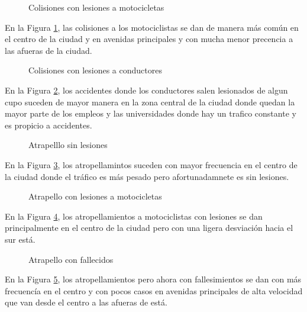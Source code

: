 \documentclass[a4paper]{article}
\begin{document}
\begin{figure}[H]
    \centering

    \caption{Colisiones con lesiones a motocicletas\\\autocite{DatosInegi}}
    \label{fig:Mapa2}
\end{figure}
En la Figura \ref{fig:Mapa2}, las colisiones  a los motociclistas se dan de manera más común en el centro de la ciudad y en avenidas principales y con mucha menor precencia a las afueras de la ciudad.


\begin{figure}[H]
    \centering

    \caption{Colisiones con lesiones a conductores\\\autocite{DatosInegi}}
    \label{fig:Mapa3}
\end{figure}
En la Figura \ref{fig:Mapa3}, los accidentes donde los conductores salen lesionados de algun cupo suceden de mayor manera en la zona central de la ciudad donde quedan la mayor parte de los empleos y las universidades donde hay un trafico constante y es propicio a accidentes.

\begin{figure}[H]
    \centering

    \caption{Atrapelllo sin lesiones\\\autocite{DatosInegi}}
    \label{fig:Mapa4}
\end{figure}
En la Figura \ref{fig:Mapa4}, los atropellamintos suceden con mayor frecuencia en el centro de la ciudad donde el tráfico es más pesado pero afortunadamnete es sin lesiones.

\begin{figure}[H]
    \centering

    \caption{Atrapello con lesiones a motocicletas\\\autocite{DatosInegi}}
    \label{fig:Mapa5}
\end{figure}
En la Figura \ref{fig:Mapa5}, los atropellamientos a motociclistas con lesiones se dan principalmente en el centro de la ciudad pero con una ligera desviación hacia el sur está.


\begin{figure}[H]
    \centering

    \caption{Atrapello con fallecidos\\\autocite{DatosInegi}}
    \label{fig:Mapa6}
\end{figure}

En la Figura \ref{fig:Mapa6}, los atropellamientos pero ahora con fallesimientos se dan con más frecuencía en el centro y con pocos casos en avenidas principales de alta velocidad que van desde el centro a las afueras de está. 
\end{document}

